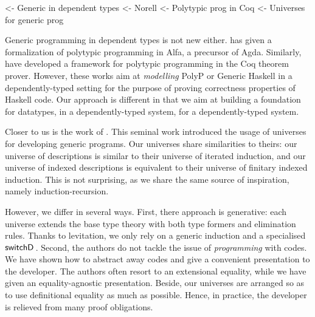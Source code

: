 \begin{wstructure}
    <- Generic in dependent types
        <- Norell \cite{norell:msc-thesis}
        <- Polytypic prog in Coq \cite{verbruggen:polytype-coq}
        <- Universes for generic prog \cite{benke:universe-generic-prog}
\end{wstructure}

Generic programming in dependent types is not new
either. \citet{norell:msc-thesis} has given a formalization of
polytypic programming in Alfa, a precursor of Agda. Similarly,
\citet{verbruggen:polytype-prog-coq, verbruggen:polytype-coq} have
developed a framework for polytypic programming in the Coq theorem
prover. However, these works aim at \emph{modelling} PolyP or Generic
Haskell in a dependently-typed setting for the purpose of proving
correctness properties of Haskell code. Our approach is different in
that we aim at building a foundation for datatypes, in a
dependently-typed system, for a dependently-typed system.

Closer to us is the work of \citet{benke:universe-generic-prog}. This
seminal work introduced the usage of universes for developing generic
programs. Our universes share similarities to theirs: our universe of
descriptions is similar to their universe of iterated induction, and
our universe of indexed descriptions is equivalent to their universe
of finitary indexed induction. This is not surprising, as we share the
same source of inspiration, namely induction-recursion.

However, we differ in several ways. First, there approach is
generative: each universe extends the base type theory with both type
formers and elimination rules. Thanks to levitation, we only rely on a
generic induction and a specialised $\switchD{\!}{\!}{\!}$. Second,
the authors do not tackle the issue of \emph{programming} with
codes. We have shown how to abstract away codes and give a convenient
presentation to the developer. The authors often resort to an
extensional equality, while we have given an equality-agnostic
presentation. Beside, our universes are arranged so as to use
definitional equality as much as possible. Hence, in practice, the
developer is relieved from many proof obligations.
